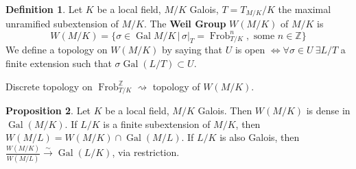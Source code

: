 \documentclass[a4paper]{article}
\theoremstyle{definition}
\newtheorem{definition}{Definition}
\theoremstyle{default}
\newtheorem{prop}[definition]{Proposition}
\theoremstyle{remark}
\DeclareMathOperator{\Gal}{Gal}
\DeclareMathOperator{\Frob}{Frob}
\begin{document}
\begin{definition}
	Let $K$ be a local field, $M/K$ Galois, $T = T_{M/K}/K$ the maximal unramified subextension of $M/K$.
	The \textbf{Weil Group} $W(M/K)$ of $M/K$ is
	$$W(M/K) = \{\sigma \in \Gal{M/K} \,|\, \sigma|_T = \Frob_{T/K}^n, \text{ some } n \in \mathbb{Z} \}$$
	We define a topology on $W(M/K)$ by saying that
	$U$ is open $\iff \forall \sigma \in U\ \exists L/T$ a finite extension such that $\sigma \Gal(L/T) \subset U$.
\end{definition}

\begin{center}
\end{center}

Discrete topology on $\Frob_{T/K}^\mathbb{Z} \rightsquigarrow$ topology of $W(M/K)$.

\begin{prop}
	Let $K$ be a local field, $M/K$ Galois.
	Then $W(M/K)$ is dense in $\Gal(M/K)$.
	If $L/K$ is a finite subextension of $M/K$,
	then $W(M/L) = W(M/K) \cap \Gal(M/L)$.
	If $L/K$ is also Galois,
	then $\frac{W(M/K)}{W(M/L)} \overset{\sim}{\longrightarrow} \Gal(L/K)$,
	via restriction.
\end{prop}
\end{document}
